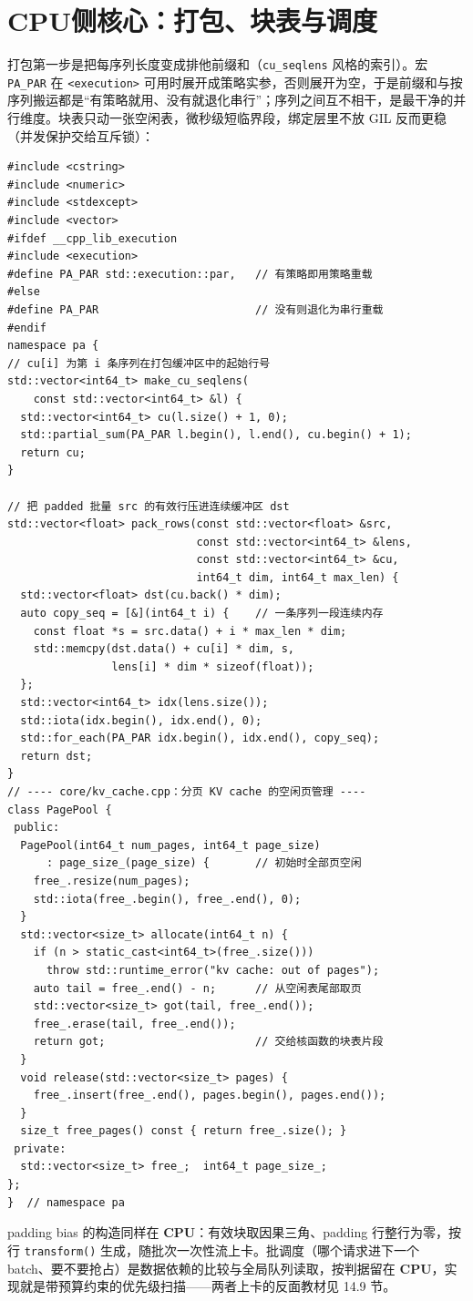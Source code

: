 \documentclass[12pt,a4paper,fontset=fandol]{ctexbook}
\newcommand{\Fn}[1]{\texttt{#1()}}
\newcommand{\Tp}[1]{\texttt{#1}}
\newcommand{\Dom}[1]{\textsf{\bfseries #1}}
\newcommand{\CPU}{\Dom{CPU}}
\begin{document}
\section{\CPU{}侧核心：打包、块表与调度}

打包第一步是把每序列长度变成排他前缀和（\Tp{cu\_seqlens} 风格的索引）。宏 \Tp{PA\_PAR} 在 \Tp{<execution>} 可用时展开成策略实参，否则展开为空，于是前缀和与按序列搬运都是``有策略就用、没有就退化串行''；序列之间互不相干，是最干净的并行维度。块表只动一张空闲表，微秒级短临界段，绑定层里不放 GIL 反而更稳（并发保护交给互斥锁）：

\begin{lstlisting}[style=cppstyle,caption={core/pack.cpp 与 core/kv\_cache.cpp：打包与块表}]
#include <cstring>
#include <numeric>
#include <stdexcept>
#include <vector>
#ifdef __cpp_lib_execution
#include <execution>
#define PA_PAR std::execution::par,   // 有策略即用策略重载
#else
#define PA_PAR                        // 没有则退化为串行重载
#endif
namespace pa {
// cu[i] 为第 i 条序列在打包缓冲区中的起始行号
std::vector<int64_t> make_cu_seqlens(
    const std::vector<int64_t> &l) {
  std::vector<int64_t> cu(l.size() + 1, 0);
  std::partial_sum(PA_PAR l.begin(), l.end(), cu.begin() + 1);
  return cu;
}

// 把 padded 批量 src 的有效行压进连续缓冲区 dst
std::vector<float> pack_rows(const std::vector<float> &src,
                             const std::vector<int64_t> &lens,
                             const std::vector<int64_t> &cu,
                             int64_t dim, int64_t max_len) {
  std::vector<float> dst(cu.back() * dim);
  auto copy_seq = [&](int64_t i) {    // 一条序列一段连续内存
    const float *s = src.data() + i * max_len * dim;
    std::memcpy(dst.data() + cu[i] * dim, s,
                lens[i] * dim * sizeof(float));
  };
  std::vector<int64_t> idx(lens.size());
  std::iota(idx.begin(), idx.end(), 0);
  std::for_each(PA_PAR idx.begin(), idx.end(), copy_seq);
  return dst;
}
// ---- core/kv_cache.cpp：分页 KV cache 的空闲页管理 ----
class PagePool {
 public:
  PagePool(int64_t num_pages, int64_t page_size)
      : page_size_(page_size) {       // 初始时全部页空闲
    free_.resize(num_pages);
    std::iota(free_.begin(), free_.end(), 0);
  }
  std::vector<size_t> allocate(int64_t n) {
    if (n > static_cast<int64_t>(free_.size()))
      throw std::runtime_error("kv cache: out of pages");
    auto tail = free_.end() - n;      // 从空闲表尾部取页
    std::vector<size_t> got(tail, free_.end());
    free_.erase(tail, free_.end());
    return got;                       // 交给核函数的块表片段
  }
  void release(std::vector<size_t> pages) {
    free_.insert(free_.end(), pages.begin(), pages.end());
  }
  size_t free_pages() const { return free_.size(); }
 private:
  std::vector<size_t> free_;  int64_t page_size_;
};
}  // namespace pa
\end{lstlisting}
padding bias 的构造同样在 \CPU{}：有效块取因果三角、padding 行整行为零，按行 \Fn{transform} 生成，随批次一次性流上卡。批调度（哪个请求进下一个 batch、要不要抢占）是数据依赖的比较与全局队列读取，按判据留在 \CPU{}，实现就是带预算约束的优先级扫描——两者上卡的反面教材见 14.9 节。
\end{document}
